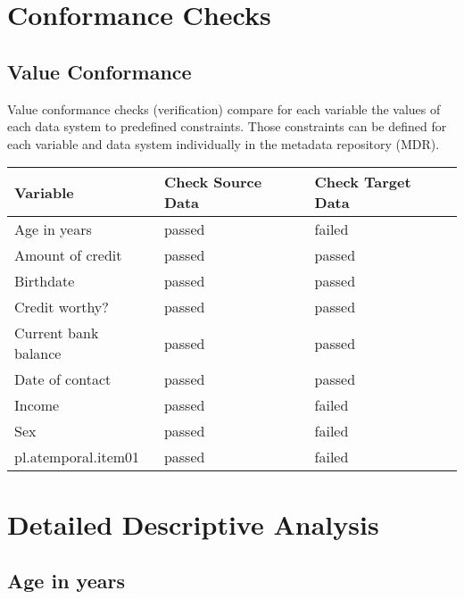 \documentclass[
]{article}
\begin{document}
\newpage

\hypertarget{conformance-checks}{%
\section{Conformance Checks}\label{conformance-checks}}

\hypertarget{value-conformance}{%
\subsection{Value Conformance}\label{value-conformance}}

Value conformance checks (verification) compare for each variable the
values of each data system to predefined constraints. Those constraints
can be defined for each variable and data system individually in the
metadata repository (MDR).

\begin{table}[H]
\centering
\begin{tabular}{l|l|l}
\hline
\textbf{Variable} & \textbf{Check Source Data} & \textbf{Check Target Data}\\
\hline
Age in years & passed & failed\\
\hline
Amount of credit & passed & passed\\
\hline
Birthdate & passed & passed\\
\hline
Credit worthy? & passed & passed\\
\hline
Current bank balance & passed & passed\\
\hline
Date of contact & passed & passed\\
\hline
Income & passed & failed\\
\hline
Sex & passed & failed\\
\hline
pl.atemporal.item01 & passed & failed\\
\hline
\end{tabular}
\end{table}

\newpage

\hypertarget{detailed-descriptive-analysis}{%
\section{Detailed Descriptive
Analysis}\label{detailed-descriptive-analysis}}

\hypertarget{age-in-years}{%
\subsection{Age in years}\label{age-in-years}}
\end{document}
